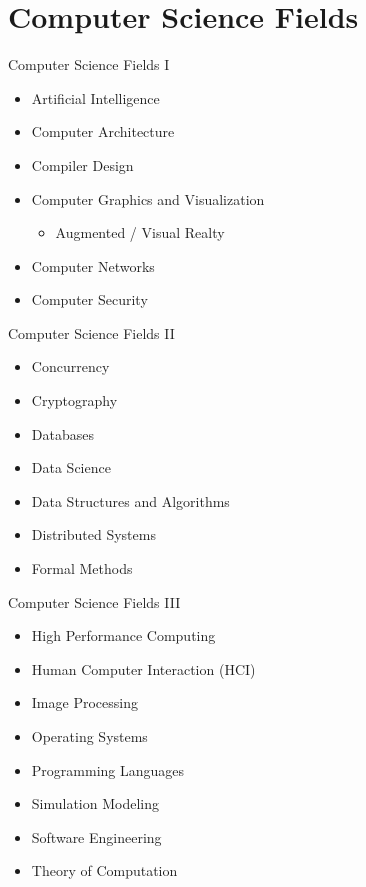 \documentclass{beamer}
\begin{document}
\section{Computer Science Fields}
\begin{frame}{Computer Science Fields I}
\begin{itemize}
	\item Artificial Intelligence
	\item Computer Architecture
	\item Compiler Design
	\item Computer Graphics and Visualization
	\begin{itemize}
		\item Augmented / Visual Realty
	\end{itemize}
	\item Computer Networks
	\item Computer Security
\end{itemize}
\end{frame}

\begin{frame}{Computer Science Fields II}
\begin{itemize}
	\item Concurrency
	\item Cryptography
	\item Databases
	\item Data Science
	\item Data Structures and Algorithms
	\item Distributed Systems
	\item Formal Methods
\end{itemize}
\end{frame}

\begin{frame}{Computer Science Fields III}
\begin{itemize}

	\item High Performance Computing
	\item Human Computer Interaction (HCI)
	\item Image Processing
	\item Operating Systems
	\item Programming Languages
	\item Simulation Modeling
	\item Software Engineering
	\item Theory of Computation
\end{itemize}
\end{frame}
\end{document}
